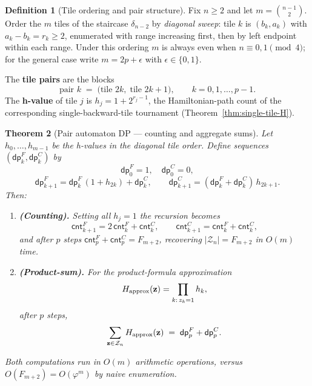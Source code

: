 \documentclass[12pt,reqno]{amsart}
\newtheorem{theorem}{Theorem}[section]
\theoremstyle{definition}
\newtheorem{definition}[theorem]{Definition}
\theoremstyle{plain}
\begin{document}
\begin{definition}[Tile ordering and pair structure]
\label{def:tile-pairs}
Fix $n\ge 2$ and let $m=\binom{n-1}{2}$.  Order the $m$ tiles of the
staircase $\delta_{n-2}$ by \emph{diagonal sweep}: tile $k$ is $(b_k,a_k)$
with $a_k-b_k=r_k\ge 2$, enumerated with range increasing first, then by
left endpoint within each range.  Under this ordering $m$ is always even
when $n\equiv 0,1\pmod 4$; for the general case write $m=2p+\epsilon$
with $\epsilon\in\{0,1\}$.

The \textbf{tile pairs} are the blocks
\[
  \text{pair } k \;=\; \bigl(\text{tile }2k,\;\text{tile }2k+1\bigr),
  \qquad k=0,1,\ldots,p-1.
\]
The \textbf{h-value} of tile $j$ is $h_j = 1 + 2^{r_j-1}$, the
Hamiltonian-path count of the corresponding single-backward-tile tournament
(Theorem~\ref{thm:single-tile-H}).
\end{definition}

\begin{theorem}[Pair automaton DP — counting and aggregate sums]
\label{thm:pair-DP}
Let $h_0,\ldots,h_{m-1}$ be the h-values in the diagonal tile order.
Define sequences $(\mathsf{dp}^F_k,\mathsf{dp}^C_k)$ by
\[
  \mathsf{dp}^F_0 = 1,\quad \mathsf{dp}^C_0 = 0,
\]
\[
  \mathsf{dp}^F_{k+1} = \mathsf{dp}^F_k\,(1+h_{2k}) + \mathsf{dp}^C_k,
  \qquad
  \mathsf{dp}^C_{k+1} = (\mathsf{dp}^F_k + \mathsf{dp}^C_k)\,h_{2k+1}.
\]
Then:
\begin{enumerate}[label=\textup{(\alph*)}]
\item \textbf{(Counting).}  Setting all $h_j = 1$ the recursion becomes
  \[
    \mathsf{cnt}^F_{k+1} = 2\,\mathsf{cnt}^F_k + \mathsf{cnt}^C_k,
    \qquad
    \mathsf{cnt}^C_{k+1} = \mathsf{cnt}^F_k + \mathsf{cnt}^C_k,
  \]
  and after $p$ steps $\mathsf{cnt}^F_p + \mathsf{cnt}^C_p = F_{m+2}$,
  recovering $|\mathcal{Z}_n|=F_{m+2}$ in $O(m)$ time.

\item \textbf{(Product-sum).}  For the product-formula approximation
  \[
    H_{\rm approx}(\mathbf{z}) = \prod_{k:\,z_k=1} h_k,
  \]
  after $p$ steps,
  \[
    \sum_{\mathbf{z}\in\mathcal{Z}_n} H_{\rm approx}(\mathbf{z})
    \;=\;
    \mathsf{dp}^F_p + \mathsf{dp}^C_p.
  \]
\end{enumerate}
Both computations run in $O(m)$ arithmetic operations, versus $O(F_{m+2})=O(\varphi^m)$
by naive enumeration.
\end{theorem}
\end{document}
